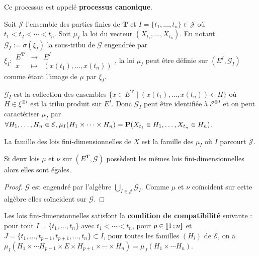	Ce processus est appelé \textbf{processus canonique}.
	
	\begin{defn}
		Soit $\mathcal{J}$ l'ensemble des parties finies de $\mathbf{T}$ et $I = \{ t_1,\ldots,t_n \} \in \mathcal{J}$ où $t_1 < t_2 < \cdots < t_n$.
		Soit $\mu_I$ la loi du vecteur $(X_{t_1},\ldots,X_{t_n})$.
		En notant $\mathcal{G}_I := \sigma(\xi_I)$ la sous-tribu de $\mathcal{G}$ engendrée par $\xi_I \colon \begin{array}{lcr} E^{\mathbf{T}} & \to & E^I \\ x & \mapsto & (x(t_1),\ldots,x(t_n)) \end{array}$, la loi $\mu_I$ peut être définie sur $(E^I, \mathcal{G}_I)$ comme étant l'image de $\mu$ par $\xi_I$.
	\end{defn}
	
	\begin{rem}
		$\mathcal{G}_I$ est la collection des ensembles $\{ x \in E^{\mathbf{T}} \mid (x(t_1),\ldots,x(t_n)) \in H \}$ où $H \in \xi^{\otimes I}$ est la tribu produit sur $E^I$.
		Donc $\mathcal{G}_I$ peut être identifiée à $\mathcal{E}^{\otimes I}$ et on peut caractériser $\mu_I$ par $\forall H_1,\ldots,H_n \in \mathcal{E}, \mu_I(H_1 \times \cdots \times H_n) = \mathbf{P}(X_{t_1} \in H_1, \ldots, X_{t_n} \in H_n)$.
	\end{rem}
	
	\begin{defn}
		La famille des lois fini-dimensionnelles de $X$ est la famille des $\mu_I$ où $I$ parcourt $\mathcal{J}$.
	\end{defn}
	
	\begin{pop}
		Si deux lois $\mu$ et $\nu$ sur $\left( E^{\mathbf{T}}, \mathcal{G} \right)$ possèdent les mêmes lois fini-dimensionnelles alors elles sont égales.
	\end{pop}
	
	\begin{proof}
		$\mathcal{G}$ est engendré par l'algèbre $\bigcup_{I \in \mathcal{J}} \mathcal{G}_I$.
		Comme $\mu$ et $\nu$ coïncident sur cette algèbre elles coïncident sur $\mathcal{G}$.
	\end{proof}
	
	\begin{pop}
		Les lois fini-dimensionnelles satisfont la \textbf{condition de compatibilité} suivante : pour tout $I = \{ t_1,\ldots,t_n \}$ avec $t_1 < \cdots < t_n$, pour $p \in \mathopen{[\![}1\mathclose{}\mathpunct{};n\mathclose{]\!]}$ et $J = \{ t_1,\ldots,t_{p - 1},t_{p + 1},\ldots,t_n \} \subset I$, pour toutes les familles  $(H_i)$ de $\mathcal{E}$, on a $\mu_I(H_1 \times \cdots H_{p - 1} \times E \times H_{p + 1} \times \cdots \times H_n) = \mu_J(H_1 \times \cdots H_n)$.
	\end{pop}
	
